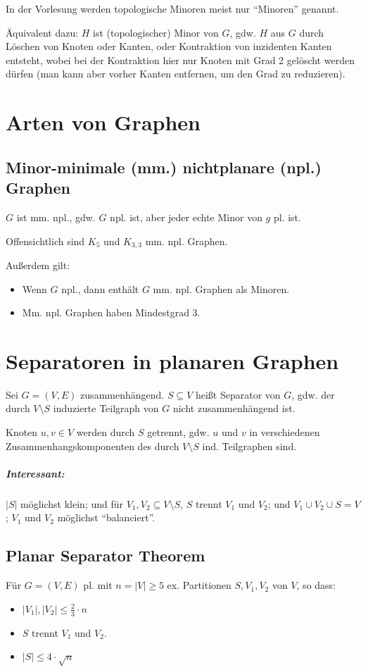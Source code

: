 \documentclass[a4paper,11pt]{report}
\begin{document}
In der Vorlesung werden topologische Minoren meist nur ``Minoren'' genannt.

Äquivalent dazu: $H$ ist (topologischer) Minor von $G$, gdw. $H$ aus $G$ durch Löschen von Knoten oder Kanten, oder Kontraktion von inzidenten Kanten entsteht, wobei bei der Kontraktion hier nur Knoten mit Grad 2 gelöscht werden dürfen (man kann aber vorher Kanten entfernen, um den Grad zu reduzieren).


\chapter{Arten von Graphen}
\section{Minor-minimale (mm.) nichtplanare (npl.) Graphen}
$G$ ist mm. npl., gdw. $G$ npl. ist, aber jeder echte Minor von $g$ pl. ist.

Offensichtlich sind $K_5$ und $K_{3, 3}$ mm. npl. Graphen.

Außerdem gilt:
\begin{itemize}
    \item Wenn $G$ npl., dann enthält $G$ mm. npl. Graphen als Minoren.
    \item Mm. npl. Graphen haben Mindestgrad 3.
\end{itemize}


\chapter{Separatoren in planaren Graphen}
Sei $G = (V, E)$ zusammenhängend. $S \subseteq V$ heißt Separator von $G$, gdw. der durch $V \setminus S$ induzierte Teilgraph von $G$ nicht zusammenhängend ist.

Knoten $u, v \in V$ werden durch $S$ getrennt, gdw. $u$ und $v$ in verschiedenen Zusammenhangskomponenten des durch $V \setminus S$ ind. Teilgraphen sind.

\paragraph{Interessant:} $|S|$ möglichst klein; und für $V_1, V_2 \subseteq V \setminus S$, $S$ trennt $V_1$ und $V_2$; und $V_1 \cup V_2 \cup S = V$; $V_1$ und $V_2$ möglichst ``balanciert''.


\section{Planar Separator Theorem}
Für $G = (V, E)$ pl. mit $n = |V| \geq 5$ ex. Partitionen $S, V_1, V_2$ von $V$, so dass:
\begin{itemize}
    \item $|V_1|, |V_2| \leq \frac{2}{3} \cdot n$
    \item $S$ trennt $V_1$ und $V_2$.
    \item $|S| \leq 4 \cdot \sqrt{n}$
\end{itemize}
\end{document}
